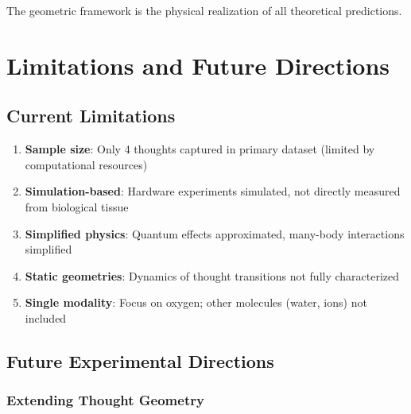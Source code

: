 \documentclass[11pt]{article}
\theoremstyle{remark}
\begin{document}
The geometric framework is the physical realization of all theoretical predictions.

\section{Limitations and Future Directions}

\subsection{Current Limitations}

\begin{enumerate}
\item \textbf{Sample size}: Only 4 thoughts captured in primary dataset (limited by computational resources)
\item \textbf{Simulation-based}: Hardware experiments simulated, not directly measured from biological tissue
\item \textbf{Simplified physics}: Quantum effects approximated, many-body interactions simplified
\item \textbf{Static geometries}: Dynamics of thought transitions not fully characterized
\item \textbf{Single modality}: Focus on oxygen; other molecules (water, ions) not included
\end{enumerate}

\subsection{Future Experimental Directions}

\subsubsection{Extending Thought Geometry}
\end{document}
